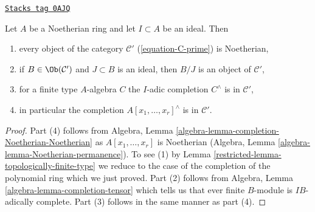 \begin{lemma}
\label{restricted-lemma-topologically-finite-type-Noetherian}
\href{https://stacks.math.columbia.edu/tag/0AJQ}{\texttt{Stacks tag 0AJQ}}

\begin{reference}
\cite[Proposition 7.5.5]{EGA1}
\end{reference}
Let $A$ be a Noetherian ring and let $I \subset A$ be an ideal. Then
\begin{enumerate}
\item every object of the category $\mathcal{C}'$
(\ref{equation-C-prime}) is Noetherian,
\item if $B \in \Ob(\mathcal{C}')$ and $J \subset B$ is an ideal,
then $B/J$ is an object of $\mathcal{C}'$,
\item for a finite type $A$-algebra $C$ the $I$-adic completion
$C^\wedge$ is in $\mathcal{C}'$,
\item in particular the completion $A[x_1, \ldots, x_r]^\wedge$
is in $\mathcal{C}'$.
\end{enumerate}
\end{lemma}

\begin{proof}

Part (4) follows from
Algebra, Lemma \ref{algebra-lemma-completion-Noetherian-Noetherian}
as $A[x_1, \ldots, x_r]$ is Noetherian
(Algebra, Lemma \ref{algebra-lemma-Noetherian-permanence}).
To see (1) by Lemma \ref{restricted-lemma-topologically-finite-type}
we reduce to the case of the completion of the polynomial ring
which we just proved.
Part (2) follows from Algebra, Lemma \ref{algebra-lemma-completion-tensor}
which tells us that ever finite $B$-module is $IB$-adically complete.
Part (3) follows in the same manner as part (4).
\end{proof}

